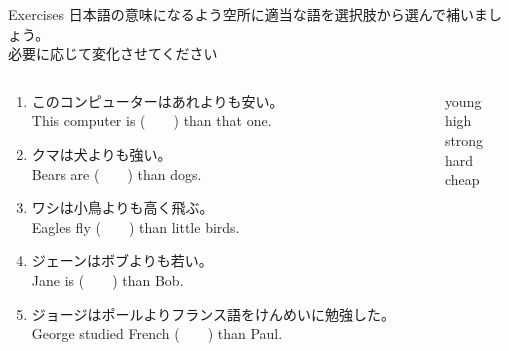 \documentclass[aspectratio=169,xcolor={dvipsnames,table}]{beamer}
\begin{document}
\begin{frame}[plain]{Exercises}
日本語の意味になるよう空所に適当な語を選択肢から選んで補いましょう。\\必要に応じて変化させてください%
\hfill{\scriptsize {}}

\begin{columns}[t]
 \begin{column}{.78\textwidth}
   \begin{enumerate}
  \item このコンピューターはあれよりも安い。\\
	This computer is (~~~~) than that one. 
    \item クマは犬よりも強い。\\
	Bears are (~~~~) than dogs. 
    \item ワシは小鳥よりも高く飛ぶ。\\
	Eagles fly (~~~~) than little birds. 
    \item ジェーンはボブよりも若い。\\
	Jane is (~~~~) than Bob. 
    \item ジョージはポールよりフランス語をけんめいに勉強した。\\
	George studied French (~~~~) than Paul. 
 \end{enumerate}
 \end{column}
\begin{column}{.2\textwidth}
 \begin{tcolorbox}
  young\\
  high\\
  strong\\
  hard\\
  cheap
 \end{tcolorbox}
\end{column}
\end{columns}
\end{frame}
\end{document}
